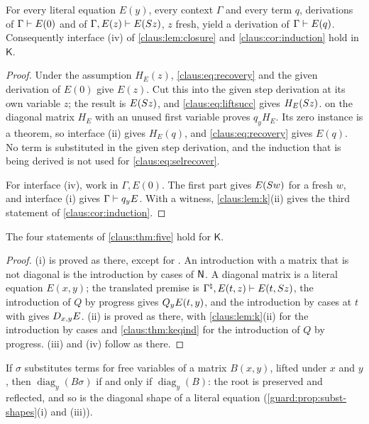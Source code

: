 \begin{theorem}
\label{claus:thm:keqind}
For every literal equation $E(y)$, every context $\Gamma$ and every term
$q$, derivations of $\Gamma\vdash E(0)$ and of
$\Gamma,E(z)\vdash E(S z)$, $z$ fresh, yield a derivation of
$\Gamma\vdash E(q)$. Consequently interface (iv) of
\cref{claus:lem:closure} and \cref{claus:cor:induction} hold in
$\mathsf{K}$.
\end{theorem}
\begin{proof}
Under the assumption $H_E(z)$, \eqref{claus:eq:recovery} and the given
derivation of $E(0)$ give $E(z)$. Cut this into the given step derivation
at its own variable $z$; the result is $E(S z)$, and
\eqref{claus:eq:liftsucc} gives $H_E(S z)$.  on the
diagonal matrix $H_E$ with an unused first variable proves $q_yH_E$. Its
zero instance is a theorem, so interface (ii) gives $H_E(q)$, and
\eqref{claus:eq:recovery} gives $E(q)$. No term is substituted in the
given step derivation, and the induction that is being derived is not used
for \eqref{claus:eq:selrecover}.

For interface (iv), work in $\Gamma,E(0)$. The first part gives
$E(S w)$ for a fresh $w$, and interface (i) gives
$\Gamma\vdash q_yE$. With a witness, \cref{claus:lem:k}(ii) gives the
third statement of \cref{claus:cor:induction}.
\end{proof}

\begin{theorem}
\label{claus:thm:k}
The four statements of \cref{claus:thm:five} hold for $\mathsf{K}$.
\end{theorem}
\begin{proof}
(i) is proved as there, except for . An introduction with
a matrix that is not diagonal is the introduction by cases of $\mathsf{N}$. A
diagonal matrix is a literal equation $E(x,y)$; the translated premise is
$\Gamma^{\natural},E(t,z)\vdash E(t,S z)$, the introduction of $Q$ by
progress gives $Q_{y}E(t,y)$, and the introduction by cases at $t$ with 
gives $D_{x,y}E$. (ii) is proved as there, with \cref{claus:lem:k}(ii) for
the introduction by cases and \cref{claus:thm:keqind} for the introduction
of $Q$ by progress. (iii) and (iv) follow as there.
\end{proof}

If $\sigma$ substitutes terms for free variables of a matrix $B(x,y)$,
lifted under $x$ and $y$, then $\operatorname{diag}_y(B\sigma)$ if and only
if $\operatorname{diag}_y(B)$: the root is preserved and reflected, and so
is the diagonal shape of a literal equation
(\cref{guard:prop:subst-shapes}(i) and (iii)).

